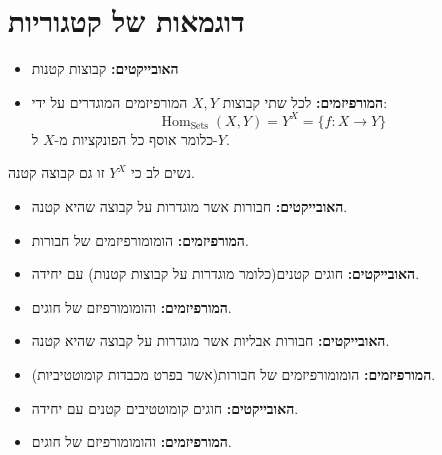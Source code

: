 \documentclass{tstextbook}
\begin{document}
\section{דוגמאות של קטגוריות}

\begin{definition}
  \begin{itemize}
    \item \textbf{האובייקטים:} קבוצות קטנות
    \item \textbf{המורפיזמים:} לכל שתי קבוצות \(X,Y\) המורפיזמים המוגדרים על ידי:
$$\operatorname{Hom}_{\operatorname{Sets}}(X,Y)=Y^{X}=\{f:X\to Y\}$$
כלומר אוסף כל הפונקציות מ-\(X\) ל-\(Y\).
  \end{itemize}
\end{definition}
\begin{remark}
נשים לב כי \(Y^{X}\) זו גם קבוצה קטנה.

\end{remark}
\begin{definition}
  \begin{itemize}
    \item \textbf{האובייקטים:} חבורות אשר מוגדרות על קבוצה שהיא קטנה.
    \item \textbf{המורפיזמים:} הומומורפיזמים של חבורות.
  \end{itemize}
\end{definition}
\begin{definition}
  \begin{itemize}
    \item \textbf{האובייקטים:} חוגים קטנים(כלומר מוגדרות על קבוצות קטנות) עם יחידה.
    \item \textbf{המורפיזמים:} והומומורפיזם של חוגים.
  \end{itemize}
\end{definition}
\begin{definition}
  \begin{itemize}
    \item \textbf{האובייקטים:} חבורות אבליות אשר מוגדרות על קבוצה שהיא קטנה.
    \item \textbf{המורפיזמים:} הומומורפיזמים של חבורות(אשר בפרט מכבדות קומוטטיביות).
  \end{itemize}
\end{definition}
\begin{definition}
  \begin{itemize}
    \item \textbf{האובייקטים:} חוגים קומוטטיבים קטנים עם יחידה.
    \item \textbf{המורפיזמים:} והומומורפיזם של חוגים.
  \end{itemize}
\end{definition}
\end{document}
